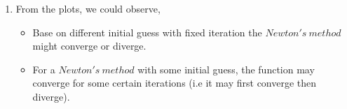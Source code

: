 \documentclass[11pt,twoside]{article}
\begin{document}
\begin{enumerate}[leftmargin=0pt]
\begin{enumerate}
	\item From the plots, we could observe,
		\begin{itemize}
		\item Base on different initial guess with fixed iteration the $Newton's \ method$ might converge or diverge.
		\item For a $Newton's \ method$ with some initial guess, the function may converge for some certain iterations (i.e it may first converge then diverge). 
		\end{itemize}
	\end{enumerate}
	
\end{enumerate}
\end{document}

